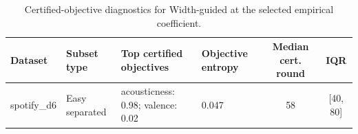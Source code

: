 \begin{table}[t]
\centering
\caption{Certified-objective diagnostics for Width-guided at the selected empirical coefficient.}
\label{tab:app-cert-objectives}
\scriptsize
\setlength{\tabcolsep}{3pt}
\begin{tabular}{llllcc}
\toprule
Dataset & Subset type & Top certified objectives & Objective entropy & Median cert. round & IQR \\
\midrule
spotify\_d6 & Easy separated & acousticness: 0.98; valence: 0.02 & 0.047 & 58 & [40, 80] \\
\bottomrule
\end{tabular}
\end{table}
